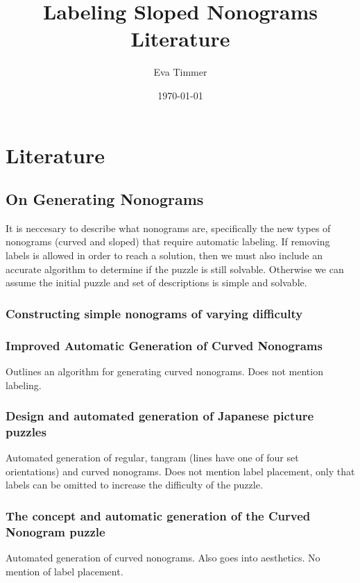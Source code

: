 \documentclass[a4paper]{article}
\title{Labeling Sloped Nonograms Literature}
\author{Eva Timmer}
\date{\today}
\begin{document}
\maketitle

\section{Literature}
\subsection{On Generating Nonograms}
It is neccesary to describe what nonograms are, specifically the new types of nonograms (curved and sloped) that require automatic labeling. If removing labels is allowed in order to reach a solution, then we must also include an accurate algorithm to determine if the puzzle is still solvable. Otherwise we can assume the initial puzzle and set of descriptions is simple and solvable.\\

\subsubsection{Constructing simple nonograms of varying difficulty\cite{batenburg2009constructing}}

\subsubsection{Improved Automatic Generation of Curved Nonograms \cite{van2017improved}}
Outlines an algorithm for generating curved nonograms. Does not mention labeling.

\subsubsection{Design and automated generation of Japanese picture puzzles \cite{van2019design}}
Automated generation of regular, tangram (lines have one of four set orientations) and curved nonograms.  Does not mention label placement, only that labels can be omitted to increase the difficulty of the puzzle.

\subsubsection{The concept and automatic generation of the Curved Nonogram puzzle \cite{de2016concept}}
Automated generation of curved nonograms. Also goes into aesthetics. No mention of label placement.
\end{document}
